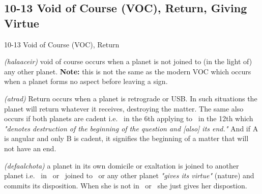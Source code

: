 \subsection{10-13 Void of Course (VOC), Return, Giving Virtue}
\begin{frame}[t]{10-13 Void of Course (VOC), Return}
\begin{description}[style=nextline]
\item[10. Void of Course] \textsl{(halaaceir)} void of course occurs when a planet is not joined to (in the light of) any other planet. \textbf{Note:} this is not the same as the modern VOC  which occurs when a planet forms no aspect before leaving a sign.

\item[11. Return] \textsl{(atrad)} Return occurs when a planet is retrograde or USB. In such situations the planet will return whatever it receives, destroying the matter. The same also occurs if both planets are cadent i.e. \Moon\ in the 6th applying to \Mars\ in the 12th which \textsl{"denotes destruction of the beginning of the question and [also] its end."} And if A is angular and only B is cadent, it signifies the beginning of a matter that will not have an end.

\item[12-13. Giving Virtue and Nature] \textsl{(defaalchota)} a planet in its own domicile or exaltation is joined to another planet i.e. \Moon\ in \Cancer\ or \Taurus\ joined to \Jupiter\ or any other planet \textsl{"gives its virtue"} (nature) and commits its disposition. When she is not in \Taurus\ or \Cancer\ she just gives her dispostion.\footnotemark[1]
\end{description}
\end{frame}
